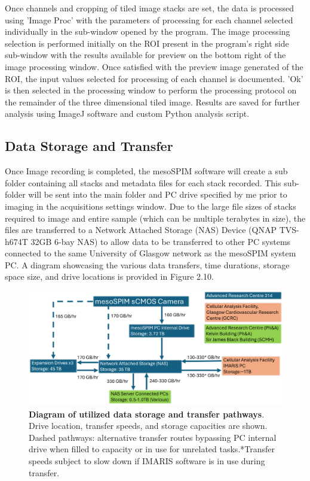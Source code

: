 Once channels and cropping of tiled image stacks are set, the data is processed using 'Image Proc' with the parameters of processing for each channel selected individually in the sub-window opened by the program. The image processing selection is performed initially on the ROI present in the program's right side sub-window with the results available for preview on the bottom right of the image processing window. Once satisfied with the preview image generated of the ROI, the input values selected for processing of each channel is documented. 'Ok' is then selected in the processing window to perform the processing protocol on the remainder of the three dimensional tiled image. Results are saved for further analysis using ImageJ software and custom Python analysis script.


\subsection{Data Storage and Transfer}
Once Image recording is completed, the mesoSPIM software will create a sub folder containing all stacks and metadata files for each stack recorded. This sub-folder will be sent into the main folder and PC drive specified by me prior to imaging in the acquisitions settings window. Due to the large file sizes of stacks required to image and entire sample (which can be multiple terabytes in size), the files are transferred to a Network Attached Storage (NAS) Device (QNAP TVS-h674T 32GB 6-bay NAS) to allow data to be transferred to other PC systems connected to the same University of Glasgow network as the mesoSPIM system PC.  A diagram showcasing the various data transfers, time durations, storage space size, and drive locations is provided in Figure 2.10.

\begin{figure}[H]
    \centering
    \includegraphics[width=0.95\linewidth]{Figures/Figure2.13TBC.png}
    \caption{\textbf{Diagram of utilized data storage and transfer pathways}. Drive location, transfer speeds, and storage capacities are shown. Dashed pathways: alternative transfer routes bypassing PC internal drive when filled to capacity or in use for unrelated tasks.*Transfer speeds subject to slow down if IMARIS software is in use during transfer.}
    \label{fig:enter-label}
\end{figure}

